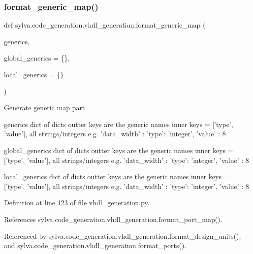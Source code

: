 \mbox{\label{namespacesylva_1_1code__generation_1_1vhdl__generation_a5bec5fea3c520448fa87982cb6bfc87f}} 
\subsubsection{\texorpdfstring{format\+\_\+generic\+\_\+map()}{format\_generic\_map()}}
{\footnotesize\ttfamily def sylva.\+code\+\_\+generation.\+vhdl\+\_\+generation.\+format\+\_\+generic\+\_\+map (\begin{DoxyParamCaption}\item[{}]{generics,  }\item[{}]{global\+\_\+generics = {\ttfamily \{\}},  }\item[{}]{local\+\_\+generics = {\ttfamily \{\}} }\end{DoxyParamCaption})}

\begin{DoxyVerb}Generate generic map part

  generics
    dict of dicts
    outter keys are the generic names
    inner keys = ['type', 'value'], all strings/integers
    e.g. { 'data_width' : { 'type': 'integer', 'value' : 8 } }

  global_generics
    dict of dicts
    outter keys are the generic names
    inner keys = ['type', 'value'], all strings/integers
    e.g. { 'data_width' : { 'type': 'integer', 'value' : 8 } }

  local_generics
    dict of dicts
    outter keys are the generic names
    inner keys = ['type', 'value'], all strings/integers
    e.g. { 'data_width' : { 'type': 'integer', 'value' : 8 } }
\end{DoxyVerb}
 

Definition at line 123 of file vhdl\+\_\+generation.\+py.



References sylva.\+code\+\_\+generation.\+vhdl\+\_\+generation.\+format\+\_\+port\+\_\+map().



Referenced by sylva.\+code\+\_\+generation.\+vhdl\+\_\+generation.\+format\+\_\+design\+\_\+units(), and sylva.\+code\+\_\+generation.\+vhdl\+\_\+generation.\+format\+\_\+ports().


